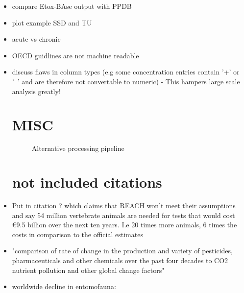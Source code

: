 \documentclass[english]{article}
\begin{document}
\begin{itemize}

\item compare Etox-BAse output with PPDB

\item plot example SSD and TU

\item acute vs chronic

\item OECD guidlines are not machine readable

\item discuss flaws in column types (e.g some concentration entries contain '+' or '~' and are therefore not convertable to numeric) - This hampers large scale analysis greatly!

\pagebreak
\section*{MISC}

\begin{figure}
    
    \caption{Alternative processing pipeline}
    \label{fig:pipeline-tree}
\end{figure}

\section*{not included citations}

\item Put in citation \citep{hartung_chemical_2009} ? which claims that REACH won't meet their assumptions and say 54 million vertebrate animals are needed for tests that would cost €9.5 billion over the next ten years. I.e 20 times more animals, 6 times the costs in comparison to the official estimates 

\item "comparison of rate of change in the production and variety of pesticides, pharmaceuticals and other chemicals over the past four decades to CO2 nutrient pollution and other global change factors" \citep{bernhardt_synthetic_2017}

\item worldwide decline in entomofauna: \citep{sanchez-bayo_worldwide_2019}


\end{itemize}
\end{document}
